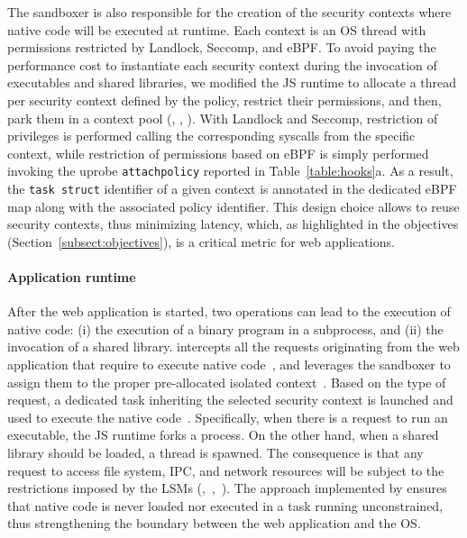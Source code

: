 The sandboxer is also responsible for the creation of the security
contexts where native code will be executed at runtime. Each context
is an OS thread with permissions restricted by Landlock, Seccomp, and
eBPF. To avoid paying the performance cost to instantiate
each security context during the invocation of executables
and shared libraries, we modified the JS runtime to allocate
a thread per security context defined by the policy, restrict their
permissions, and then, park them in a context pool (,
, ).
%
  With Landlock and Seccomp, restriction of privileges is performed
  calling the corresponding syscalls from the specific context, while
  restriction of permissions based on eBPF is simply performed
  invoking the uprobe {\tt attach\textunderscore policy} reported in
  Table~\ref{table:hooks}a. As a result, the {\tt task\textunderscore
    struct} identifier of a given context is annotated in the
  dedicated eBPF map along with the associated policy identifier.  
%
This design choice allows to reuse security contexts, thus
  minimizing latency, which, as highlighted in the objectives
(Section~\ref{subsect:objectives}), is a critical metric for web
applications.

\paragraph{Application runtime}
After the web application is started, two operations can lead to the
execution of native code: (i) the execution of a binary program in a
subprocess, and (ii) the invocation of a shared library. \natisand
intercepts all the requests originating from the web application that
require to execute native code~, and leverages the
sandboxer to assign them to the proper pre-allocated isolated
context~. Based on the type of request, a dedicated
task inheriting the selected security context is launched and
used to execute the native code~.
Specifically, when there is a request to run an executable,
the JS runtime forks a process. On the other hand, when a shared
library should be loaded, a thread is spawned. The consequence is
that any request to access file system, IPC, and network resources will
be subject to the restrictions imposed by the LSMs
(,~,~). The approach
implemented by \natisand ensures that native code is never loaded nor
executed in a task running unconstrained, thus strengthening the
boundary between the web application and the OS.

